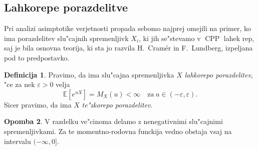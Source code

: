 \documentclass[12pt, a4paper, reqno]{amsart}
\theoremstyle{definition}
\newtheorem{definicija}{Definicija}[section]
\newtheorem{opomba}[definicija]{Opomba}
\theoremstyle{plain}
\newcommand{\E}{\mathbb{E}}
\newcommand{\1}{\mathds{1}}
\DeclareMathOperator{\CPP}{CPP}
\begin{document}
    
    \subsection{Lahkorepe porazdelitve}
        Pri analizi asimptotike verjetnosti propada se\newline bomo najprej omejili na primer, ko ima 
        porazdelitev slu"cajnih spremenljivk $X_i$, ki jih 
        se"stevamo v $\CPP$ lahek rep, saj je bila osnovna teorija, ki sta jo razvila H.\ Cramér in F.\ Lundberg,
        izpeljana pod to predpostavko.

        \begin{definicija}
            Pravimo, da ima slu"cajna spremenljivka $X$ \textit{lahkorepo porazdelitev}, "ce za 
            nek $\varepsilon > 0$ velja
        \begin{equation*}
            \E\left[e^{uX}\right] = M_X(u) < \infty \quad \text{za} \ u \in (-\varepsilon, \varepsilon).
        \end{equation*}
        Sicer pravimo, 
        da ima $X$ \textit{te"zkorepo porazdelitev}.
        \label{def:lahkorepnaPorazdelitev}
        \end{definicija}

        \begin{opomba}
            V razdelku ve"cinoma delamo z nenegativnimi slu"cajnimi spremenljivkami. Za te momentno-rodovna 
            funckija vedno obstaja vsaj na intervalu $(-\infty, 0]$.
        \end{opomba}
\end{document}
